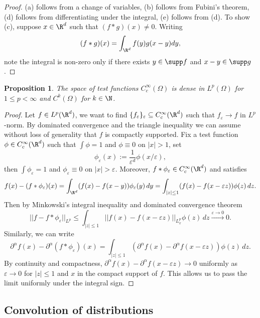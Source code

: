 \documentclass[reqno]{amsart}
\newtheorem{proposition}[theorem]{Proposition}
\theoremstyle{definition}
\theoremstyle{remark}
\renewcommand{\epsilon}{\varepsilon}
\begin{document}
\begin{proof}
	(a) follows from a change of variables, (b) follows from Fubini's theorem, (d) follows from differentiating under the integral, (e) follows from (d). To show (c), suppose $x \in \R^d$ such that $(f * g)(x) \neq 0$. Writing 
		\[ (f * g)(x) = \int_{\R^d} f(y) g(x - y) dy, \]
	note the integral is non-zero only if there exists $y \in \supp f$ and $x - y \in \supp g$. 
\end{proof}

\begin{proposition}
	The space of test functions $C^\infty_c (\Omega)$ is dense in $L^p (\Omega)$ for $1 \leq p < \infty$ and $C^k (\Omega)$ for $k \in \N$. 
\end{proposition}

\begin{proof}
	Let $f \in L^p (\R^d)$, we want to find $\{ f_\epsilon \}_\epsilon \subseteq C^\infty_c (\R^d)$ such that $f_\epsilon \to f$ in $L^p$-norm. By dominated convergence and the triangle inequality we can assume without loss of generality that $f$ is compactly supported. Fix a test function $\phi \in C^\infty_c (\R^d)$ such that $\int \phi = 1$ and $\phi \equiv 0$ on $|x| > 1$, set
		\[ \phi_\epsilon (x) := \frac{1}{\epsilon^d} \phi(x/\epsilon), \]
	then $\int \phi_\epsilon = 1$ and $\phi_\epsilon \equiv 0$ on $|x| > \epsilon$. Moreover, $f * \phi_\epsilon \in C^\infty_c (\R^d)$ and satisfies
		\[ f(x) - (f * \phi_\epsilon)(x) = \int_{\R^d} (f(x) - f(x - y)) \phi_\epsilon (y) \, dy = \int_{|z| \leq 1} (f(x) - f(x - \epsilon z)) \phi(z) \, dz. \]
	Then by Minkowski's integral inequality and dominated convergence theorem 
		\[ ||f - f * \phi_\epsilon||_{L^p} \leq \int_{|z| \leq 1} || f (x) - f(x - \epsilon z) ||_{L^p_x} \phi(z) \, dz \overset{\epsilon \to 0}{\longrightarrow} 0. \]	
	Similarly, we can write
		\[ \partial^\alpha f(x) - \partial^\alpha(f * \phi_\epsilon)(x) = \int_{|z| \leq 1} (\partial^\alpha f(x) - \partial^\alpha f(x - \epsilon z)) \phi(z) \, dz. \]	
	By continuity and compactness, $\partial^\alpha f(x) - \partial^\alpha f(x - \epsilon z) \to 0$ uniformly as $\epsilon \to 0$ for $|z| \leq 1$ and $x$ in the compact support of $f$. This allows us to pass the limit uniformly under the integral sign. 
\end{proof}

\subsection{Convolution of distributions}
\end{document}
